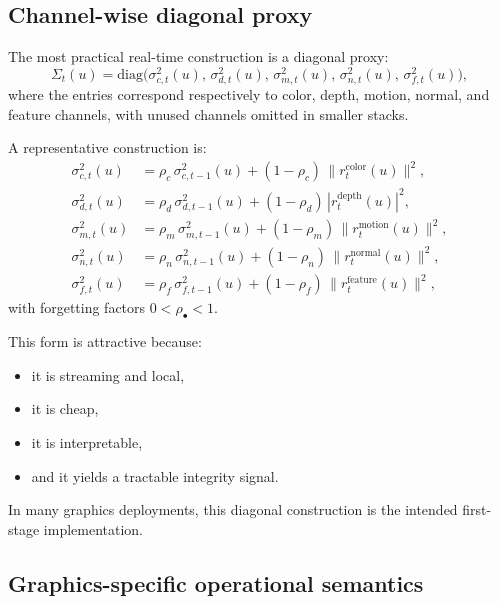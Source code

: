 \documentclass[11pt]{article}
\theoremstyle{definition}
\theoremstyle{plain}
\begin{document}

\subsection{Channel-wise diagonal proxy}

The most practical real-time construction is a diagonal proxy:
\begin{equation}
\Sigma_t(u)=
\mathrm{diag}\!\bigl(
\sigma^{2}_{c,t}(u),\,
\sigma^{2}_{d,t}(u),\,
\sigma^{2}_{m,t}(u),\,
\sigma^{2}_{n,t}(u),\,
\sigma^{2}_{f,t}(u)
\bigr),
\end{equation}
where the entries correspond respectively to color, depth, motion, normal, and feature channels, with unused channels omitted in smaller stacks.

A representative construction is:
\begin{align}
\sigma^{2}_{c,t}(u) &= \rho_c\,\sigma^{2}_{c,t-1}(u) + (1-\rho_c)\,\|r^{\mathrm{color}}_t(u)\|^2,\\
\sigma^{2}_{d,t}(u) &= \rho_d\,\sigma^{2}_{d,t-1}(u) + (1-\rho_d)\,|r^{\mathrm{depth}}_t(u)|^2,\\
\sigma^{2}_{m,t}(u) &= \rho_m\,\sigma^{2}_{m,t-1}(u) + (1-\rho_m)\,\|r^{\mathrm{motion}}_t(u)\|^2,\\
\sigma^{2}_{n,t}(u) &= \rho_n\,\sigma^{2}_{n,t-1}(u) + (1-\rho_n)\,\|r^{\mathrm{normal}}_t(u)\|^2,\\
\sigma^{2}_{f,t}(u) &= \rho_f\,\sigma^{2}_{f,t-1}(u) + (1-\rho_f)\,\|r^{\mathrm{feature}}_t(u)\|^2,
\end{align}
with forgetting factors $0<\rho_\bullet<1$.

This form is attractive because:
\begin{itemize}[leftmargin=1.5em]
    \item it is streaming and local,
    \item it is cheap,
    \item it is interpretable,
    \item and it yields a tractable integrity signal.
\end{itemize}

In many graphics deployments, this diagonal construction is the intended first-stage implementation.


\subsection{Graphics-specific operational semantics}
\end{document}
